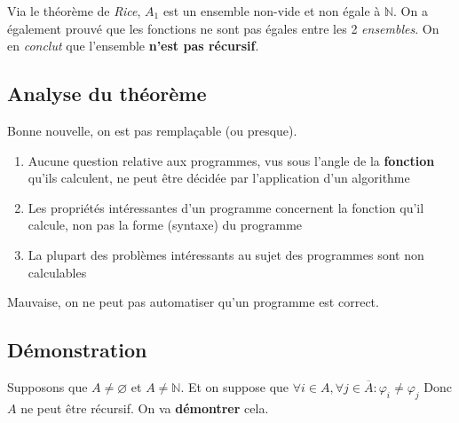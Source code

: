 \documentclass{report}
\begin{document}
Via le théorème de \textit{Rice}, $A_1$ est un ensemble non-vide et non égale à $\mathbb{N}$. On a également prouvé que les fonctions ne sont pas égales entre les 2 \textit{ensembles}. On en \textit{conclut} que l'ensemble \textbf{n'est pas récursif}.

\subsection{Analyse du théorème}
Bonne nouvelle, on est pas remplaçable (ou presque).
\begin{enumerate}
\item Aucune question relative aux programmes, vus sous l'angle de la \textbf{fonction} qu'ils calculent, ne peut être décidée par l'application d'un algorithme
\item Les propriétés intéressantes d'un programme concernent la fonction qu'il calcule, non pas la forme (syntaxe) du programme
\item La plupart des problèmes intéressants au sujet des programmes sont non
calculables
\end{enumerate}
Mauvaise, on ne peut pas automatiser qu'un programme est correct.

\subsection{Démonstration}
Supposons que $A \neq \varnothing$ et $A \neq \mathbb{N}$. Et on suppose que $\forall i \in A, \forall j \in \overline{A}: \varphi_i \neq \varphi_j$ Donc $A$ ne peut être récursif. On va \textbf{démontrer} cela.\\
\end{document}
